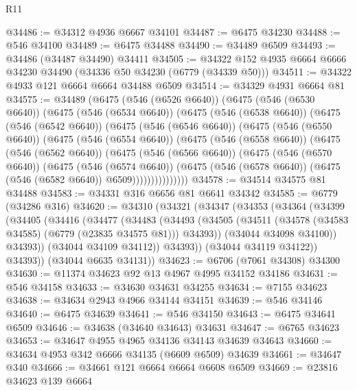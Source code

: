 \begin{lexlean}{R11}
\begin{coremodule}
@34486 := @34312 @4936 @6667 @34101
@34487 := @6475 @34230
@34488 := @546 @34100
@34489 := @6475 @34488
@34490 := @34489 @6509
@34493 := @34486 (@34487 @34490) @34411
@34505 := @34322 @152 @4935 @6664 @6666 @34230 @34490 (@34336 @50 @34230 (@6779 (@34339 @50)))
@34511 := @34322 @4933 @121 @6664 @6664 @34488 @6509
@34514 := @34329 @4931 @6664 @81
@34575 := @34489
    (@6475
      (@546 (@6526 @6640))
      (@6475
        (@546 (@6530 @6640))
        (@6475
          (@546 (@6534 @6640))
          (@6475
            (@546 (@6538 @6640))
            (@6475
              (@546 (@6542 @6640))
              (@6475
                (@546 (@6546 @6640))
                (@6475
                  (@546 (@6550 @6640))
                  (@6475
                    (@546 (@6554 @6640))
                    (@6475
                      (@546 (@6558 @6640))
                      (@6475
                        (@546 (@6562 @6640))
                        (@6475
                          (@546 (@6566 @6640))
                          (@6475
                            (@546 (@6570 @6640))
                            (@6475
                              (@546 (@6574 @6640))
                              (@6475
                                (@546 (@6578 @6640))
                                (@6475 (@546 (@6582 @6640)) @6509)))))))))))))))
@34578 := @34514 @34575 @81 @34488
@34583 := @34331 @316 @6656 @81 @6641 @34342
@34585 := @6779 (@34286 @316)
@34620 := @34310
    (@34321
      (@34347
        (@34353
          (@34364
            (@34399
              (@34405
                (@34416
                  (@34477
                    (@34483
                      (@34493
                        (@34505
                          (@34511 (@34578 (@34583 @34585) (@6779 (@23835 @34575 @81))) @34393))
                        (@34044 @34098 @34100))
                      @34393))
                  (@34044 @34109 @34112))
                @34393))
            (@34044 @34119 @34122))
          @34393))
      (@34044 @6635 @34131))
@34623 := @6706 (@7061 @34308) @34300
@34630 := @11374 @34623 @92 @13 @4967 @4995 @34152 @34186
@34631 := @546 @34158
@34633 := @34630 @34631 @34255
@34634 := @7155 @34623
@34638 := @34634 @2943 @4966 @34144 @34151
@34639 := @546 @34146
@34640 := @6475 @34639
@34641 := @546 @34150
@34643 := @6475 @34641 @6509
@34646 := @34638 (@34640 @34643) @34631
@34647 := @6765 @34623
@34653 := @34647 @4955 @4965 @34136 @34143 @34639 @34643
@34660 := @34634 @4953 @342 @6666 @34135 (@6609 @6509) @34639
@34661 := @34647 @340
@34666 := @34661 @121 @6664 @6664 @6608 @6509
@34669 := @23816 @34623 @139 @6664

\end{coremodule}
\end{lexlean}
